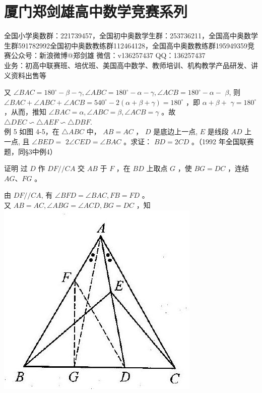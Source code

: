 \documentclass[10pt]{article}
\begin{document}
\section*{厦门郑剑雄高中数学竞赛系列}
全国小学奥数群：221739457，全国初中奥数学生群：253736211，全国高中奥数学生群591782992全国初中奥数教练群112464128，全国高中奥数教练群195949359竞赛公众号：新浪微博@郑剑雄 微信：v136257437 QQ：136257437\\
业务：初高中联赛班、培优班、美国高中数学、教师培训、机构教学产品研发、讲义资料出售等

又 $\angle B A C=180^{\circ}-\beta-\gamma, \angle A B C=180^{\circ}-\alpha-\gamma, \angle A C B=180^{\circ}-\alpha-$ $\beta$, 则 $\angle B A C+\angle A B C+\angle A C B=540^{\circ}-2(\alpha+\beta+\gamma)=180^{\circ}$ ，即 $\alpha+\beta+$ $\gamma=180^{\circ}$ ，从而，推知 $\angle B A C=\alpha, \angle A B C=\beta, \angle A C B=\gamma$ 。故\\
$\triangle D E C \backsim \triangle A E F \backsim \triangle D B F$.\\
例 5 如图 4-5，在 $\triangle A B C$ 中， $A B=A C$ ， $D$ 是底边上一点, $E$ 是线段 $A D$ 上一点, 且 $\angle B E D=$ $2 \angle C E D=\angle B A C$ 。求证： $B D=2 C D$ 。（1992 年全国联赛题，同§3中例4）

证明 过 $D$ 作 $D F / / C A$ 交 $A B$ 于 $F$ ，在 $B D$ 上取点 $G$ ，使 $B G=D C$ ，连结 $A G 、 F G$ 。

由 $D F / / C A$, 有 $\angle B F D=\angle B A C, F B=F D$ 。\\
又 $A B=A C, \angle A B G=\angle A C D, B G=D C$ ，知\\
\includegraphics[max width=\textwidth, center]{2024_10_30_2c8f45efd4a519b08e1ag-039(1)}
\end{document}
